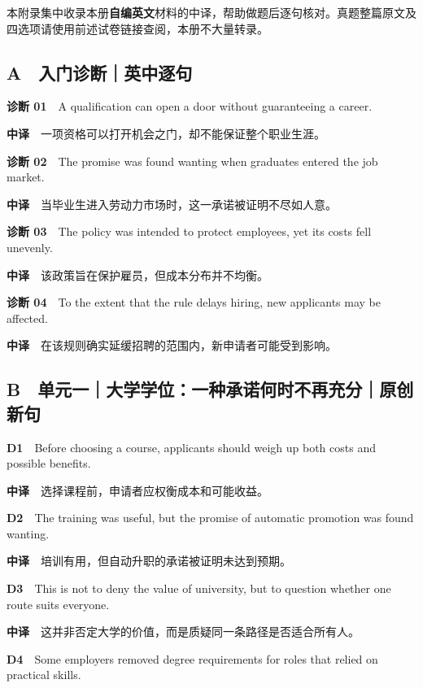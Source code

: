 \documentclass[
  11pt,
]{ctexart}
\begin{document}
本附录集中收录本册\textbf{自编英文}材料的中译，帮助做题后逐句核对。真题整篇原文及四选项请使用前述试卷链接查阅，本册不大量转录。

\subsection{A　入门诊断｜英中逐句}\label{a-ux5165ux95e8ux8bcaux65adux82f1ux4e2dux9010ux53e5}

\textbf{诊断 01}　A qualification can open a door without guaranteeing a
career.

\textbf{中译}　一项资格可以打开机会之门，却不能保证整个职业生涯。

\textbf{诊断 02}　The promise was found wanting when graduates entered
the job market.

\textbf{中译}　当毕业生进入劳动力市场时，这一承诺被证明不尽如人意。

\textbf{诊断 03}　The policy was intended to protect employees, yet its
costs fell unevenly.

\textbf{中译}　该政策旨在保护雇员，但成本分布并不均衡。

\textbf{诊断 04}　To the extent that the rule delays hiring, new
applicants may be affected.

\textbf{中译}　在该规则确实延缓招聘的范围内，新申请者可能受到影响。

\subsection{B　单元一｜大学学位：一种承诺何时不再充分｜原创新句}\label{b-ux5355ux5143ux4e00ux5927ux5b66ux5b66ux4f4dux4e00ux79cdux627fux8bfaux4f55ux65f6ux4e0dux518dux5145ux5206ux539fux521bux65b0ux53e5}

\textbf{D1}　Before choosing a course, applicants should weigh up both
costs and possible benefits.

\textbf{中译}　选择课程前，申请者应权衡成本和可能收益。

\textbf{D2}　The training was useful, but the promise of automatic
promotion was found wanting.

\textbf{中译}　培训有用，但自动升职的承诺被证明未达到预期。

\textbf{D3}　This is not to deny the value of university, but to
question whether one route suits everyone.

\textbf{中译}　这并非否定大学的价值，而是质疑同一条路径是否适合所有人。

\textbf{D4}　Some employers removed degree requirements for roles that
relied on practical skills.
\end{document}
